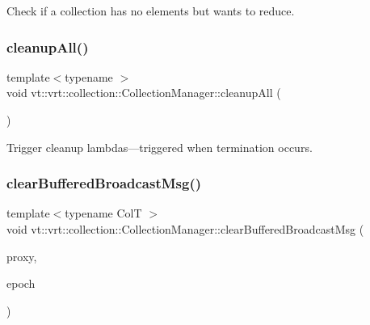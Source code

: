 Check if a collection has no elements but wants to reduce. 

\mbox{\label{structvt_1_1vrt_1_1collection_1_1_collection_manager_a7d98e5aaa63d70cbabfbcf78a6cf503f}} 
\subsubsection{\texorpdfstring{cleanup\+All()}{cleanupAll()}}
{\footnotesize\ttfamily template$<$typename $>$ \\
void vt\+::vrt\+::collection\+::\+Collection\+Manager\+::cleanup\+All (\begin{DoxyParamCaption}{ }\end{DoxyParamCaption})}



Trigger cleanup lambdas---triggered when termination occurs. 

\mbox{\label{structvt_1_1vrt_1_1collection_1_1_collection_manager_a0366f1427431dcd6fedd41dee9a3fcce}} 
\subsubsection{\texorpdfstring{clear\+Buffered\+Broadcast\+Msg()}{clearBufferedBroadcastMsg()}}
{\footnotesize\ttfamily template$<$typename ColT $>$ \\
void vt\+::vrt\+::collection\+::\+Collection\+Manager\+::clear\+Buffered\+Broadcast\+Msg (\begin{DoxyParamCaption}\item[{\hyperlink{namespacevt_a1b417dd5d684f045bb58a0ede70045ac}{Virtual\+Proxy\+Type} const \&}]{proxy,  }\item[{\hyperlink{namespacevt_a985a5adf291c34a3ca263b3378388236}{Epoch\+Type} const \&}]{epoch }\end{DoxyParamCaption})\hspace{0.3cm}{\ttfamily [private]}}



